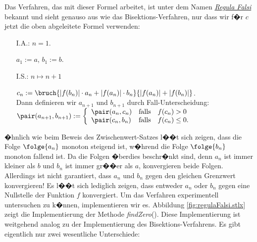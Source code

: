 Das Verfahren, das mit dieser Formel arbeitet, ist unter dem Namen 
\href{http://de.wikipedia.org/wiki/Regula_falsi}{\emph{Regula Falsi}}
bekannt und sieht genauso aus wie das Bisektions-Verfahren, nur dass wir f�r $c$ jetzt
die oben abgeleitete Formel verwenden:
\begin{enumerate}
\item[I.A.:] $n=1$.

      $a_1 := a$, \quad $b_1 := b$.
\item[I.S.:] $n \mapsto n+1$

      \hspace*{1.3cm} $c_n := \bruch{|f(b_n)|\cdot a_n + |f(a_n)|\cdot b_n}{|f(a_n)| + |f(b_n)|}$. \\[0.3cm]
      Dann definieren wir $a_{n+1}$ und $b_{n+1}$ durch Fall-Unterscheidung:
      \\[0.2cm]
      \hspace*{1.3cm}
      $\pair(a_{n+1},b_{n+1}) := 
         \left\{ \begin{array}{ll}
                 \pair(a_n,c_n) & \mbox{falls}\quad f(c_n) >    0 \\
                 \pair(c_n,b_n) & \mbox{falls}\quad f(c_n) \leq 0. \\
                 \end{array}
         \right.
      $
\end{enumerate}
�hnlich wie beim Beweis des Zwischenwert-Satzes l��t sich zeigen, dass die Folge
$\folge{a_n}$ monoton steigend ist, w�hrend die Folge $\folge{b_n}$ monoton fallend ist.
Da die Folgen �berdies beschr�nkt sind, denn $a_n$ ist immer kleiner als $b$ und $b_n$ ist
immer gr��er als $a$, konvergieren beide Folgen.  Allerdings ist nicht garantiert, dass
$a_n$ und $b_n$ gegen den gleichen Grenzwert konvergieren!  Es l��t sich lediglich zeigen,
dass entweder $a_n$ oder $b_n$ gegen eine Nullstelle der Funktion $f$ konvergiert.
Um das Verfahren experimentell untersuchen zu k�nnen, implementieren wir es.
Abbildung \ref{fig:regulaFalsi.stlx} zeigt die Implementierung der Methode
\textsl{findZero}().   Diese Implementierung ist weitgehend analog zu der Implementierung des
Bisektions-Verfahrens.  Es gibt eigentlich nur zwei wesentliche Unterschiede:
